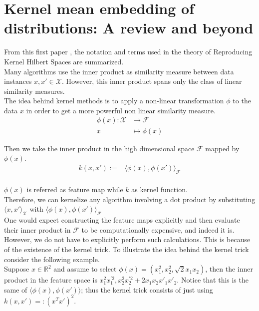 
\section{Kernel mean embedding of distributions: A review and beyond}
From this first paper \cite{Muandet_2017}, the notation and terms used in the theory of Reproducing Kernel Hilbert Spaces are summarized.
\\
Many algorithms use the inner product as similarity measure between data instances $x, x' \in \mathcal{X}$. However, this inner product spans only the class of linear similarity measures. 
\\
The idea behind kernel methods is to apply a non-linear transformation $\phi$ to the data $x$ 
in order to get a more powerful non linear similarity measure.
\begin{align*}
\phi(x):\mathcal{X} &\longrightarrow \mathcal{F}
    \\
    x&\mapsto \phi(x)
\end{align*}


Then we take the inner product in the high dimensional space $\mathcal{F}$ mapped by $\phi(x)$.
\\
\begin{align*}
k(x,x'):=&\langle \phi(x), \phi(x') \rangle_{\mathcal{F}}
\end{align*}
\\
$\phi(x)$ is referred as feature map while $k$ as kernel function.
\\
Therefore, we can kernelize any algorithm involving a dot product by substituting $\langle x, x' \rangle_{\mathcal{X}}$ with $\langle \phi(x), \phi(x') \rangle_{\mathcal{F}}$
\\
One would expect constructing the feature maps explicitly and then evaluate their inner product in $\mathcal{F}$ to be computationally expensive, and indeed it is. However, we do not have to explicitly perform such calculations. This is because of the existence of the kernel trick.
To illustrate the idea behind the kernel trick consider the following example. 
\\
Suppose $x \in \mathbb{R}^2$ and assume to select $\phi(x)=(x_{1}^{2},x_{2}^{2},\sqrt{2}x_{1}x_{2})$, then the inner product in the feature space is $x_{1}^{2}x_{1}^{'2},x_{2}^{2}x_{2}^{'2}+2x_{1}x_{2}x'_{1}x'_{2}$.
Notice that this is the same of $\langle \phi(x), \phi(x') \rangle$; thus the kernel trick consists of just using $k(x,x')=:(x^Tx')^2$.



